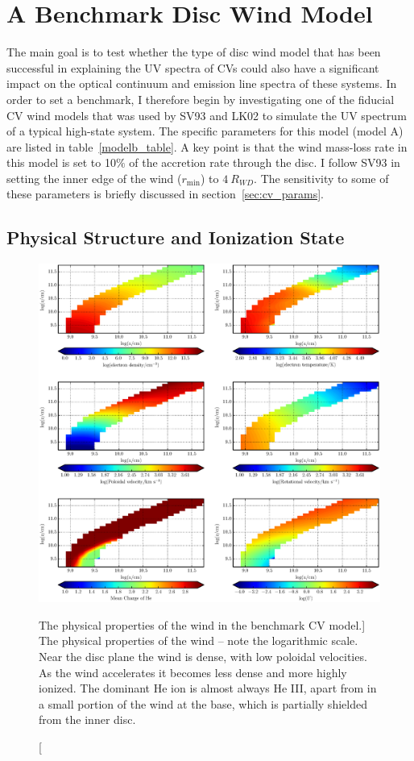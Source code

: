 \nocite{walker1963}

\section{A Benchmark Disc Wind Model}
\label{modela}

The main goal is to test whether the type of disc wind model that has
been successful in explaining the UV spectra of CVs could also have a
significant impact on the optical continuum and emission line spectra
of these systems. In order to set a benchmark, I therefore begin by
investigating one of the fiducial CV wind models that was used by SV93
and LK02 to simulate the UV spectrum of a typical high-state
system. The specific parameters for this model (model A) are listed in
table~\ref{modelb_table}. A key point is that the wind mass-loss rate in this model is
set to 10$\%$ of the accretion rate through the disc. I follow SV93
in setting the inner edge of the wind ($r_{\mathrm{min}}$) to $4~R_{WD}$. 
The sensitivity to some of these parameters is briefly discussed in
section~\ref{sec:cv_params}. 

\subsection{Physical Structure and Ionization State}
\label{modela_ionization}

\begin{figure}
\includegraphics[width=1.0\textwidth]{figures/05-cvpaper/fig5.eps}
\caption
[The physical properties of the wind in the benchmark CV model.]
{
The physical properties of the wind -- note the logarithmic scale. 
Near the disc plane the wind is dense, with low poloidal velocities.
As the wind accelerates it becomes less dense
and more highly ionized. The dominant He ion
is almost always He III, apart from in a small
portion of the wind at the base, which is partially shielded
from the inner disc.
}
\label{wind}
\end{figure}

